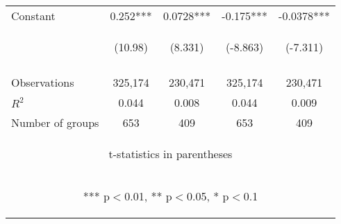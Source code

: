 \documentclass[]{article}
\begin{document}
\begin{center}
\begin{tabular}{lcccc}
Constant & 0.252*** & 0.0728*** & -0.175*** & -0.0378*** \\
 & \begin{footnotesize}(10.98)\end{footnotesize} & \begin{footnotesize}(8.331)\end{footnotesize} & \begin{footnotesize}(-8.863)\end{footnotesize} & \begin{footnotesize}(-7.311)\end{footnotesize} \\
\vspace{4pt} & \begin{footnotesize}\end{footnotesize} & \begin{footnotesize}\end{footnotesize} & \begin{footnotesize}\end{footnotesize} & \begin{footnotesize}\end{footnotesize} \\
Observations & 325,174 & 230,471 & 325,174 & 230,471 \\
$R^2$ & 0.044 & 0.008 & 0.044 & 0.009 \\
 Number of groups & 653 & 409 & 653 & 409 \\ \hline
\multicolumn{5}{c}{\begin{footnotesize} t-statistics in parentheses\end{footnotesize}} \\
\multicolumn{5}{c}{\begin{footnotesize} *** p$<$0.01, ** p$<$0.05, * p$<$0.1\end{footnotesize}} \\
\end{tabular}
\end{center}
\end{document}
